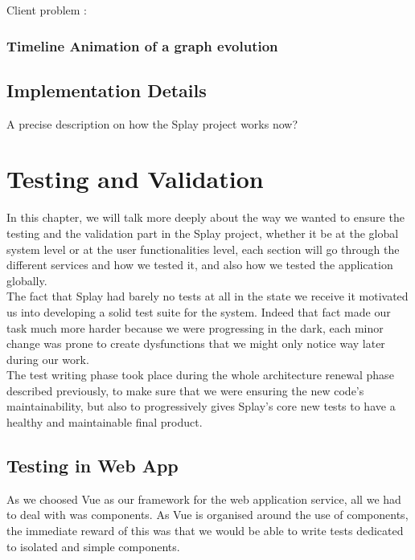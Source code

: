 \documentclass{eplmastersthesis}
\begin{document}
        Client problem :

      \subsection{Timeline Animation of a graph evolution}

    \section{Implementation Details}

      A precise description on how the Splay project works now?


  \chapter{Testing and Validation}

    In this chapter, we will talk more deeply about the way we wanted to ensure
    the testing and the validation part in the Splay project, whether it be
    at the global system level or at the user functionalities level, each
    section will go through the different services and how we tested it, and
    also how we tested the application globally.\\

    The fact that Splay had barely no tests at all in the state we receive it
    motivated us into developing a solid test suite for the system.
    Indeed that fact made our task much more harder because we were progressing
    in the dark, each minor change was prone to create dysfunctions that we
    might only notice way later during our work.\\

    The test writing phase took place during the whole architecture renewal
    phase described previously, to make sure that we were ensuring the new
    code's maintainability, but also to progressively gives Splay's core
    new tests to have a healthy and maintainable final product.

    \section{Testing in Web App}

      As we choosed Vue as our framework for the web application service,
      all we had to deal with was components. As Vue is organised around
      the use of components, the immediate reward of this was that we would
      be able to write tests dedicated to isolated and simple components.
\end{document}
